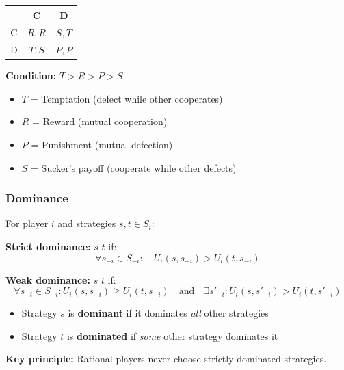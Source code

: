 \begin{defbox}
\begin{center}
\renewcommand{\arraystretch}{1.3}
\begin{tabular}{@{} c | c c @{}}
 & C & D \\
\midrule
C & $R, R$ & $S, T$ \\
D & $T, S$ & $P, P$ \\
\end{tabular}
\end{center}

\textbf{Condition:} $T > R > P > S$

\begin{itemize}
  \item $T$ = Temptation (defect while other cooperates)
  \item $R$ = Reward (mutual cooperation)
  \item $P$ = Punishment (mutual defection)
  \item $S$ = Sucker's payoff (cooperate while other defects)
\end{itemize}
\end{defbox}

\bigseparator

\subsubsection{Dominance}

\begin{defbox}
For player $i$ and strategies $s, t \in S_i$:

\textbf{Strict dominance:} $s$  $t$ if:
\[
\forall s_{-i} \in S_{-i}: \quad U_i(s, s_{-i}) > U_i(t, s_{-i})
\]

\textbf{Weak dominance:} $s$  $t$ if:
\[
\forall s_{-i} \in S_{-i}: U_i(s, s_{-i}) \geq U_i(t, s_{-i}) \quad \text{and} \quad \exists s'_{-i}: U_i(s, s'_{-i}) > U_i(t, s'_{-i})
\]
\end{defbox}

\begin{defbox}
\begin{itemize}
  \item Strategy $s$ is \textbf{dominant} if it dominates \textit{all} other strategies
  \item Strategy $t$ is \textbf{dominated} if \textit{some} other strategy dominates it
\end{itemize}

\textbf{Key principle:} Rational players never choose strictly dominated strategies.
\end{defbox}

